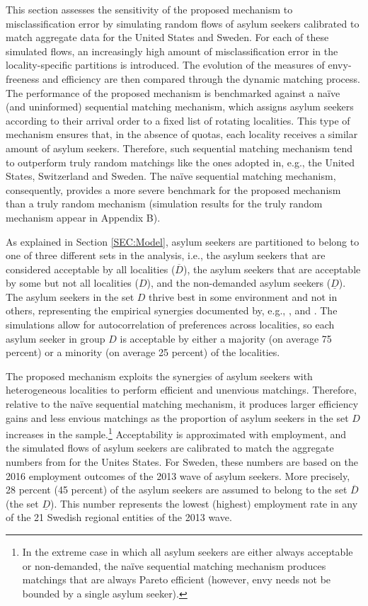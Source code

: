 \documentclass[12pt,fleqn]{article}
\begin{document}
This section assesses the sensitivity of the proposed mechanism to misclassification error by simulating random flows of asylum seekers calibrated to match aggregate data for the United States and Sweden. For each of these simulated flows, an increasingly high amount of misclassification error in the locality-specific partitions is introduced. The evolution of the measures of envy-freeness and efficiency are then compared through the dynamic matching process. The performance of the proposed mechanism is benchmarked against a na\"{i}ve (and uninformed) sequential matching mechanism, which assigns asylum seekers according to their arrival order to a fixed list of rotating localities. This type of mechanism ensures that, in the absence of quotas, each locality receives a similar amount of asylum seekers. Therefore, such sequential matching mechanism tend to outperform truly random matchings like the ones adopted in, e.g., the United States, Switzerland and Sweden. The na\"{i}ve sequential matching mechanism, consequently, provides a more severe benchmark for the proposed mechanism than a truly random mechanism (simulation results for the truly random mechanism appear in Appendix B).

As explained in Section \ref{SEC:Model}, asylum seekers are partitioned to belong to one of three different sets in the analysis, i.e., the asylum seekers that are considered acceptable by all localities ($\overline{D}$), the asylum seekers that are acceptable by some but not all localities ($D$), and the non-demanded asylum seekers ($\underline{D}$). The asylum seekers in the set $D$ thrive best in some environment and not in others, representing the empirical synergies documented by, e.g., \cite{bib:BansakEtAl}, \citet{bib:Damm} and \citet{bib:EdinEtAl}. The simulations allow for autocorrelation of preferences across localities, so each asylum seeker in group $D$ is acceptable by either a majority (on average 75 percent) or a minority (on average 25 percent) of the localities.

The proposed mechanism exploits the synergies of asylum seekers with heterogeneous localities to perform efficient and unenvious matchings. Therefore, relative to the na\"{i}ve sequential matching mechanism, it produces larger efficiency gains and less envious matchings as the proportion of asylum seekers in the set $D$ increases in the sample.\footnote{In the extreme case in which all asylum seekers are either always acceptable or non-demanded, the na\"{i}ve sequential matching mechanism produces matchings that are always Pareto efficient (however, envy needs not be bounded by a single asylum seeker).} Acceptability is approximated with employment, and the simulated flows of asylum seekers are calibrated to match the aggregate numbers from \cite{bib:BansakEtAl} for the Unites States. For Sweden, these numbers are based on the 2016 employment outcomes of the 2013 wave of asylum seekers. More precisely, 28 percent (45 percent) of the asylum seekers are assumed to belong to the set $\overline{D}$ (the set $\underline{D}$). This number represents the lowest (highest) employment rate in any of the 21 Swedish regional entities of the 2013 wave.
\end{document}
